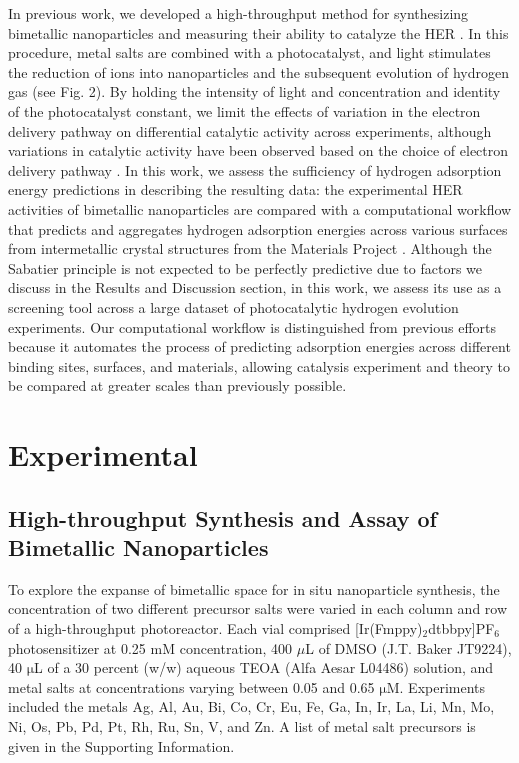 \documentclass[preprint,12pt]{elsarticle}
\begin{document}
 
In previous work, we developed a high-throughput method for synthesizing bimetallic nanoparticles and measuring their ability to catalyze the HER \cite{lopato2020parallelized,bhat2022accelerated,simon2022ligand}. In this procedure, metal salts are combined with a photocatalyst, and light stimulates the reduction of ions into nanoparticles and the subsequent evolution of hydrogen gas (see Fig. 2). By holding the intensity of light and concentration and identity of the photocatalyst constant, we limit the effects of variation in the electron delivery pathway on differential catalytic activity across experiments, although variations in catalytic activity have been observed based on the choice of electron delivery pathway \cite{pokhrel2015best}. In this work, we assess the sufficiency of hydrogen adsorption energy predictions in describing the resulting data: the experimental HER activities of bimetallic nanoparticles are compared with a computational workflow that predicts and aggregates hydrogen adsorption energies across various surfaces from intermetallic crystal structures from the Materials Project \cite{ong2013python}. Although the Sabatier principle is not expected to be perfectly predictive due to factors we discuss in the Results and Discussion section, in this work, we assess its use as a screening tool across a large dataset of photocatalytic hydrogen evolution experiments. Our computational workflow is distinguished from previous efforts because it automates the process of predicting adsorption energies across different binding sites, surfaces, and materials, allowing catalysis experiment and theory to be compared at greater scales than previously possible.

\section{Experimental}\label{Section:Experimental}
\subsection{High-throughput Synthesis and Assay of Bimetallic Nanoparticles}
To explore the expanse of bimetallic space for in situ nanoparticle synthesis, the concentration of two different precursor salts were varied in each column and row of a high-throughput photoreactor. Each vial comprised [Ir(Fmppy)$_2$dtbbpy]PF$_6$ photosensitizer at 0.25 mM concentration, 400 $\mu$L of DMSO (J.T. Baker JT9224), 40 $\mathrm{\mu}$L of a 30 percent (w/w) aqueous TEOA (Alfa Aesar L04486) solution, and metal salts at concentrations varying between 0.05 and 0.65 $\mathrm{\mu}$M. Experiments included the metals Ag, Al, Au, Bi, Co, Cr, Eu, Fe, Ga, In, Ir, La, Li, Mn, Mo, Ni, Os, Pb, Pd, Pt, Rh, Ru, Sn, V, and Zn. A list of metal salt precursors is given in the Supporting Information.
\end{document}
